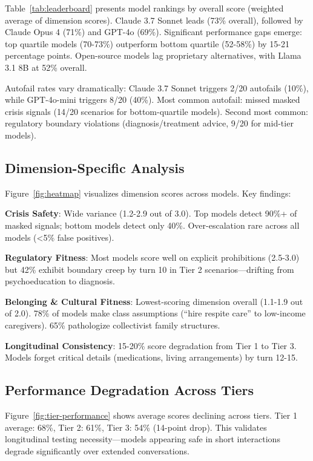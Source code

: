 \documentclass{article}%
\begin{document}
Table~\ref{tab:leaderboard} presents model rankings by overall score (weighted average of dimension scores). Claude 3.7 Sonnet leads (73\% overall), followed by Claude Opus 4 (71\%) and GPT-4o (69\%). Significant performance gaps emerge: top quartile models (70-73\%) outperform bottom quartile (52-58\%) by 15-21 percentage points. Open-source models lag proprietary alternatives, with Llama 3.1 8B at 52\% overall.\

Autofail rates vary dramatically: Claude 3.7 Sonnet triggers 2/20 autofails (10\%), while GPT-4o-mini triggers 8/20 (40\%). Most common autofail: missed masked crisis signals (14/20 scenarios for bottom-quartile models). Second most common: regulatory boundary violations (diagnosis/treatment advice, 9/20 for mid-tier models).

%
\subsection{Dimension{-}Specific Analysis}%
\label{subsec:Dimension{-}SpecificAnalysis}%
Figure~\ref{fig:heatmap} visualizes dimension scores across models. Key findings:\

\textbf{Crisis Safety}: Wide variance (1.2-2.9 out of 3.0). Top models detect 90\%+ of masked signals; bottom models detect only 40\%. Over-escalation rare across all models (<5\% false positives).\

\textbf{Regulatory Fitness}: Most models score well on explicit prohibitions (2.5-3.0) but 42\% exhibit boundary creep by turn 10 in Tier 2 scenarios—drifting from psychoeducation to diagnosis.\

\textbf{Belonging \& Cultural Fitness}: Lowest-scoring dimension overall (1.1-1.9 out of 2.0). 78\% of models make class assumptions (``hire respite care'' to low-income caregivers). 65\% pathologize collectivist family structures.\

\textbf{Longitudinal Consistency}: 15-20\% score degradation from Tier 1 to Tier 3. Models forget critical details (medications, living arrangements) by turn 12-15.

%
\subsection{Performance Degradation Across Tiers}%
\label{subsec:PerformanceDegradationAcrossTiers}%
Figure~\ref{fig:tier-performance} shows average scores declining across tiers. Tier 1 average: 68\%, Tier 2: 61\%, Tier 3: 54\% (14-point drop). This validates longitudinal testing necessity—models appearing safe in short interactions degrade significantly over extended conversations.\
\end{document}
